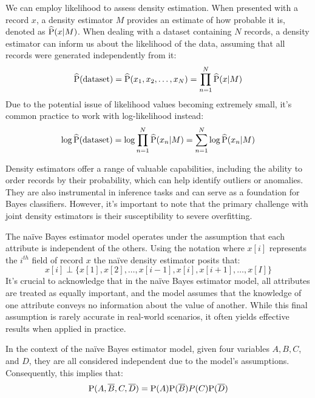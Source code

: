 \documentclass[12pt, a4paper]{report}
\begin{document}
    We can employ likelihood to assess density estimation. 
    When presented with a record $x$, a density estimator $M$ provides an estimate of how probable it is, denoted as $\widehat{\textnormal{P}}(x|M)$. 
    When dealing with a dataset containing $N$ records, a density estimator can inform us about the likelihood of the data, assuming that all records were generated independently from it:
    \[\widehat{\textnormal{P}}(\textnormal{dataset})=\widehat{\textnormal{P}}(x_1,x_2,\dots,x_N)=\prod_{n=1}^{N}\widehat{\textnormal{P}}(x|M)\]
    Due to the potential issue of likelihood values becoming extremely small, it's common practice to work with log-likelihood instead:
    \[\log{\widehat{\textnormal{P}}(\textnormal{dataset})}=\log{\prod_{n=1}^{N}{\widehat{\textnormal{P}}(x_n|M)}}=\sum_{n=1}^{N}{\log{\widehat{\textnormal{P}}(x_n|M)}}\]
    
    Density estimators offer a range of valuable capabilities, including the ability to order records by their probability, which can help identify outliers or anomalies. 
    They are also instrumental in inference tasks and can serve as a foundation for Bayes classifiers. 
    However, it's important to note that the primary challenge with joint density estimators is their susceptibility to severe overfitting.
    
    The naïve Bayes estimator model operates under the assumption that each attribute is independent of the others. 
    Using the notation where $x[i]$ represents the $i^{th}$ field of record $x$ the naïve density estimator posits that:
    \[x[i] \perp \{x[1],x[2],\dots,x[i-1],x[i],x[i+1],\dots,x[I]\}\]
    It's crucial to acknowledge that in the naïve Bayes estimator model, all attributes are treated as equally important, and the model assumes that the knowledge of one attribute conveys no information about the value of another. 
    While this final assumption is rarely accurate in real-world scenarios, it often yields effective results when applied in practice.
    \begin{example}
        In the context of the naïve Bayes estimator model, given four variables $A,B,C$, and $D$, they are all considered independent due to the model's assumptions. Consequently, this implies that:
        \[\textnormal{P}(A,\overline{B},C,\overline{D}) = \textnormal{P}(A)\textnormal{P}(\overline{B})P(C)\textnormal{P}(\overline{D})\]
    \end{example}
\end{document}
